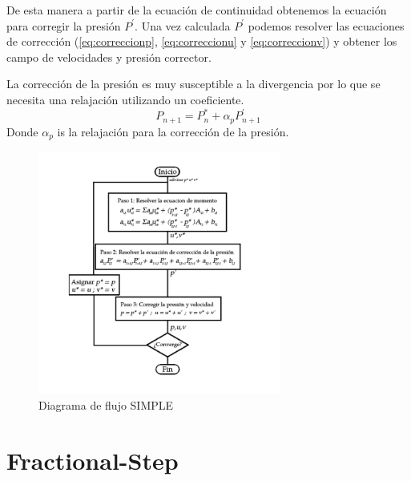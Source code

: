 \documentclass[a4paper,10pt, oneside]{book}
\begin{document}
De esta manera a partir de la ecuación de continuidad obtenemos la ecuación para corregir la presión $P^\prime$. Una vez calculada $P^\prime$ podemos resolver las ecuaciones de corrección (\ref{eq:correccionp}, \ref{eq:correccionu} y \ref{eq:correccionv}) y obtener los campo de velocidades y presión corrector.

La corrección de la presión es muy susceptible a la divergencia por lo que se necesita una relajación utilizando un coeficiente.
\begin{equation}
 P_{n+1} = P_n^* + \alpha_p P_{n+1}^\prime
\end{equation}
Donde $\alpha_p$ is la relajación para la corrección de la presión.
\begin{figure}[h!]
  \centering
  \includegraphics[width=8cm]{Img/7-7}
  \caption{Diagrama de flujo SIMPLE}
  \label{fig:7-7}
\end{figure}


\section{Fractional-Step}
\end{document}

